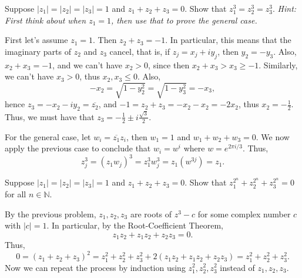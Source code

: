 \documentclass[11pt,dvipsnames]{book}
\numberwithin{equation}{section} %
\numberwithin{figure}{section} %
\numberwithin{table}{section} %
\begin{document}
\begin{exercise} Suppose $|z_{1}|=|z_{2}|=|z_{3}|=1$ and $z_{1}+z_{2}+z_{3}=0$. Show that $z_{1}^3=z_{2}^3=z_{3}^3$. {\it Hint: First think about when $z_{1}=1$, then use that to prove the general case.}

\begin{solution}
First let's assume $z_{1}=1$. Then $z_{2}+z_{3}=-1$. In particular, this means that the imaginary parts of $z_{2}$ and $z_{3}$ cancel, that is, if $z_{j}=x_{j}+iy_{j}$, then $y_{2}=-y_{3}$. Also, $x_{2}+x_{3}=-1$, and we can't have $x_{2}>0$, since then $x_{2}+x_{3}>x_{3}\geq -1$. Similarly, we can't have $x_{3}>0$, thus $x_{2},x_{3}\leq 0$. Also, 
\[
-x_{2} = \sqrt{1-y_{2}^2} = \sqrt{1-y_{3}^2}= -x_{3},\]
hence $z_{3} = -x_{2} -iy_{2} = \overline{z_{2}}$, and $-1=z_{2}+z_{3}=-x_{2}-x_{2}=-2x_{2}$, thus $x_{2}=-\frac{1}{2}$. Thus, we must have that $z_{3} = -\frac{1}{2}\pm i\frac{\sqrt{3}}{2}$. 

For the general case, let $w_{i}=\overline{z_{1}}z_{i}$, then $w_{1}=1$ and $w_{1}+w_{2}+w_{3}=0$. We now apply the previous case to conclude that $w_{i} = w^{i}$ where $w=e^{2\pi i/3}$. Thus,
\[
z_{j}^3 = (z_{1} w_{j})^3 = z_{1}^3 w_{j}^3 = z_{1} (w^{3j})=z_{1}.
\]
\end{solution}
\end{exercise}


\begin{exercise} Suppose $|z_{1}|=|z_{2}|=|z_{3}|=1$ and $z_{1}+z_{2}+z_{3}=0$. Show that $z_{1}^{2^{n}}+z_{2}^{2^{n}}+z_{3}^{2^{n}}=0$ for all $n\in \mathbb{N}$. 

\begin{solution}
By the previous problem, $z_1,z_2,z_3$ are roots of $z^3-c$ for some complex number $c$ with $|c|=1$. In particular, by the Root-Coefficient Theorem,
\[
z_{1}z_{2}+z_{1}z_{2}+z_{2}z_{3}=0.
\]
Thus, 
\[
0=(z_{1}+z_{2}+z_{3})^2 = z_{1}^2+z_{2}^2+z_{3}^2 + 2(z_{1}z_{2}+z_{1}z_{2}+z_{2}z_{3})=z_{1}^2+z_{2}^2+z_{3}^2 .
\]
Now we can repeat the process by induction using $z_{1}^2,z_{2}^2,z_{3}^2$ instead of $z_1,z_2,z_3$.
\end{solution} 


\end{exercise}
\end{document}
